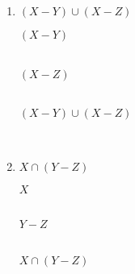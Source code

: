 \documentclass[../notes.tex]{subfiles}
\begin{document}
\begin{enumerate}
\begin{enumerate}
\begin{center}
									\begin{venndiagram3sets}[shade=circle area, labelA=$X$, labelB=$Y$, labelC=$Z$]
										\fillOnlyA
									\end{venndiagram3sets}\\
								\end{center}
							\pagebreak
							\item $(X - Y) \cup (X - Z)$
								\begin{center}
									$(X - Y)$\\
									\begin{venndiagram3sets}[shade=circle area, labelA=$X$, labelB=$Y$, labelC=$Z$]
										\fillANotB
									\end{venndiagram3sets}\\
									$(X - Z)$\\
									\begin{venndiagram3sets}[shade=circle area, labelA=$X$, labelB=$Y$, labelC=$Z$]
										\fillANotC
									\end{venndiagram3sets}\\
									$(X - Y) \cup (X - Z)$\\
									\begin{venndiagram3sets}[shade=circle area, labelA=$X$, labelB=$Y$, labelC=$Z$]
										\fillANotB
										\fillANotC
									\end{venndiagram3sets}\\
								\end{center}
							\pagebreak
							\item $X \cap (Y - Z)$
								\begin{center}
									$X$\\
									\begin{venndiagram3sets}[shade=circle area, labelA=$X$, labelB=$Y$, labelC=$Z$]
										\fillA
									\end{venndiagram3sets}\\
									$Y - Z$\\
									\begin{venndiagram3sets}[shade=circle area, labelA=$X$, labelB=$Y$, labelC=$Z$]
										\fillBNotC
									\end{venndiagram3sets}\\
									$X \cap (Y - Z)$\\
									\begin{venndiagram3sets}[shade=circle area, labelA=$X$, labelB=$Y$, labelC=$Z$]
										\fillACapBNotC
									\end{venndiagram3sets}\\

\end{center}
\end{enumerate}
\end{enumerate}
\end{document}
